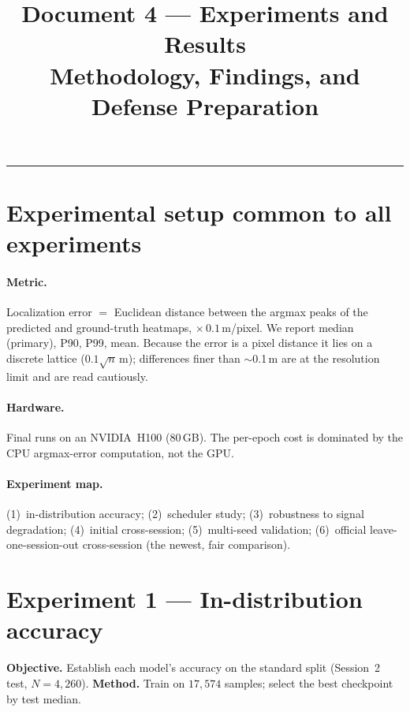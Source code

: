 \documentclass[11pt,a4paper]{article}
\title{\vspace{-1.5em}\textbf{Document 4 --- Experiments and Results}\\
\large Methodology, Findings, and Defense Preparation}
\author{}
\date{}
\begin{document}
\maketitle
\tableofcontents
\vspace{1em}\hrule\vspace{1em}

\section{Experimental setup common to all experiments}

\paragraph{Metric.} Localization error $=$ Euclidean distance between the argmax peaks of the
predicted and ground-truth heatmaps, $\times\,0.1$\,m/pixel. We report median (primary), P90,
P99, mean. Because the error is a pixel distance it lies on a discrete lattice
($0.1\sqrt{n}$\,m); differences finer than $\sim$0.1\,m are at the resolution limit and are read
cautiously.

\paragraph{Hardware.} Final runs on an NVIDIA~H100 (80\,GB). The per-epoch cost is dominated by
the CPU argmax-error computation, not the GPU.

\paragraph{Experiment map.} (1)~in-distribution accuracy; (2)~scheduler study;
(3)~robustness to signal degradation; (4)~initial cross-session; (5)~multi-seed validation;
(6)~official leave-one-session-out cross-session (the newest, fair comparison).

\section{Experiment 1 --- In-distribution accuracy}

\textbf{Objective.} Establish each model's accuracy on the standard split (Session~2 test,
$N=4{,}260$). \textbf{Method.} Train on $17{,}574$ samples; select the best checkpoint by test
median.
\end{document}
